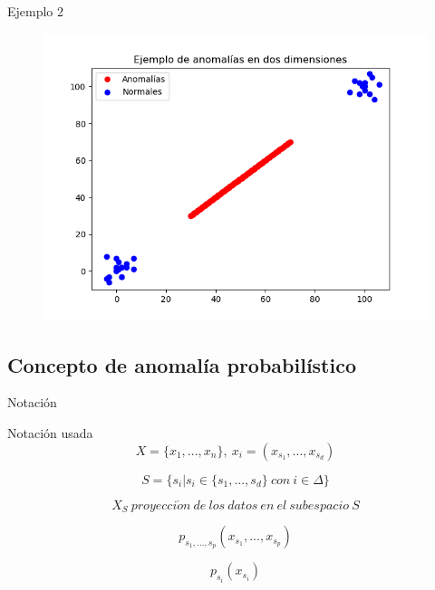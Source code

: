 \documentclass[10pt]{beamer}
\begin{document}
\begin{frame}[fragile]{Ejemplo 2}
	\vspace{10px}
	
	\begin{figure}
		\centering
		\includegraphics[scale=0.6]{Imagenes/outlier-2d-case2.png}
	\end{figure}
	
\end{frame}

\subsection{Concepto de anomalía probabilístico}


\begin{frame}[fragile]{Notación}
	\vspace{10px}
	\pause
	
	\begin{block}{Notación usada}
		$$X = \{ x_1 , ... , x_n \}, \ x_i = (x_{s_1} , ... , x_{s_d})$$
		
		\pause
		
		$$S = \{ s_i | s_i \in \{ s_1 , ... , s_d \} \ con \ i\in \Delta \}$$
		
		\pause
		
		$$X_S \ proyecci\acute{o}n \ de \ los \ datos \ en \ el \ subespacio \ S$$
		
		\pause
		
		$$p_{s_1 , ... , s_p}(x_{s_1} , ... , x_{s_p})$$
		
		\pause
		
		$$p_{s_i}(x_{s_i})$$
	\end{block}
	
\end{frame}
\end{document}
